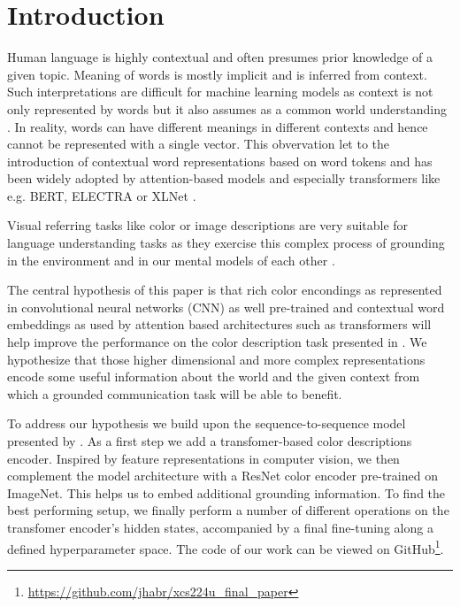 \section{Introduction}

Human language is highly contextual and often presumes prior knowledge of a given topic. Meaning of words is mostly implicit and is inferred from context. Such interpretations are difficult for machine learning models as context is not only represented by words but it also assumes as a common world understanding \citep{monroe-2017-colors}. In reality, words can have different meanings in different contexts and hence cannot be represented with a single vector. This obvervation let to the introduction of contextual word representations based on word tokens and has been widely adopted by attention-based models and especially transformers like e.g. BERT, ELECTRA or XLNet \citep{smith-2019-contextual,vaswani-2017-attention}.

\par
Visual referring tasks like color or image descriptions are very suitable for language understanding tasks as they exercise this complex process of grounding in the environment and in our mental models of each other \citep{monroe-2017-colors, karpathy-2014-image_descriptions}.

\par
The central hypothesis of this paper is that rich color encondings as represented in convolutional neural networks (CNN) as well pre-trained and contextual word embeddings as used by attention based architectures such as transformers will help improve the performance on the color description task presented in \citep{monroe-2017-colors}. We hypothesize that those higher dimensional and more complex representations encode some useful information about the world and the given context from which a grounded communication task will be able to benefit.

\par
To address our hypothesis we build upon the sequence-to-sequence model presented by \citep{monroe-2017-colors}. As a first step we add a transfomer-based color descriptions encoder. Inspired by feature representations in computer vision, we then complement the model architecture with a ResNet color encoder pre-trained on ImageNet. This helps us to embed additional grounding information. To find the best performing setup, we finally perform a number of different operations on the transfomer encoder's hidden states, accompanied by a final fine-tuning along a defined hyperparameter space. The code of our work can be viewed on GitHub\footnote{\url{https://github.com/jhabr/xcs224u_final_paper}}.
